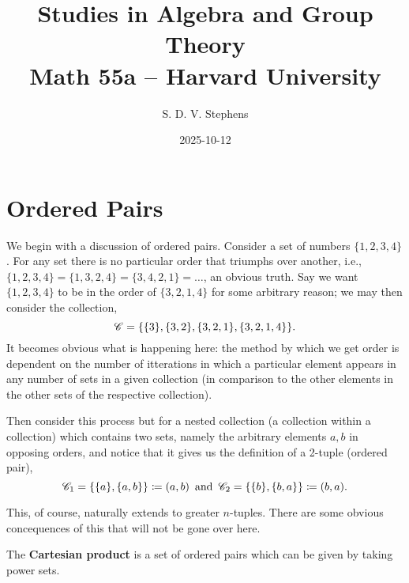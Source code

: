 \documentclass[a4paper]{report}
\title{\Huge{Studies in Algebra and Group Theory}\\Math 55a -- Harvard University}
\author{\huge{S. D. V. Stephens}}
\date{2025-10-12}
\begin{document}
\maketitle
\newpage
{}
\tableofcontents
\pagebreak




\section{Ordered Pairs}
We begin with a discussion of ordered pairs. Consider a set of numbers \( \{1,2,3,4\}   \). For any set there is no particular order that triumphs over another, i.e., \( \{1,2,3,4\} = \{1,3,2,4\} = \{3,4,2,1\} =\ldots     \), an obvious truth. Say we want \( \{1,2,3,4\}   \) to be in the order of \( \{3,2,1,4\}   \) for some arbitrary reason; we may then consider the collection,
\[
  {\mathscr{C}} = \{\{3\} , \{3,2\} ,\{3,2,1\} , \{3,2,1,4\}     \}
.\] 
It becomes obvious what is happening here: the method by which we get order is dependent on the number of itterations in which a particular element appears in any number of sets in a given collection (in comparison to the other elements in the other sets of the respective collection). 

Then consider this process but for a nested collection (a collection within a collection) which contains two sets, namely the arbitrary elements \( a,b \) in opposing orders, and notice that it gives us the definition of a 2-tuple (ordered pair),
\[
  {\mathscr{C}}_{1} = \{\{a\} ,\{a,b\}   \} \coloneqq (a,b) \, \text{ and }\, {\mathscr{C}}_{2}  = \{\{b\} ,\{b,a\}   \} \coloneqq  (b,a)  
.\] 

This, of course, naturally extends to greater \( n \)-tuples. There are some obvious concequences of this that will not be gone over here. 

The \textbf{Cartesian product} is a set of ordered pairs which can be given by taking power sets. 

\end{document}
